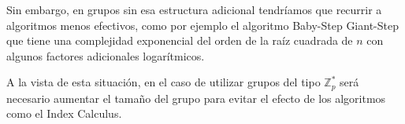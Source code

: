 Sin embargo, en grupos sin esa estructura adicional tendr\'iamos que recurrir a algoritmos menos efectivos, como por ejemplo el algoritmo Baby-Step Giant-Step que tiene una complejidad
exponencial del orden de la ra\'iz cuadrada de $n$ con algunos factores adicionales logar\'itmicos.

A la vista de esta situaci\'on, en el caso de utilizar grupos del tipo ${\mathbb Z}_p^*$ ser\'a necesario aumentar el tama\~no del grupo para evitar el efecto de los algoritmos
como el Index Calculus.
